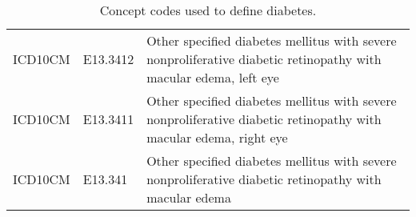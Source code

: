 \begin{table}[ht]
\begin{tabular}{lll}
  ICD10CM & E13.3412 & Other specified diabetes mellitus with severe nonproliferative diabetic retinopathy with macular edema, left eye \\ 
  ICD10CM & E13.3411 & Other specified diabetes mellitus with severe nonproliferative diabetic retinopathy with macular edema, right eye \\ 
  ICD10CM & E13.341 & Other specified diabetes mellitus with severe nonproliferative diabetic retinopathy with macular edema \\ 
   \hline
\end{tabular}
\caption{Concept codes used to define diabetes.} 
\label{tab:codes_diabetes}
\end{table}
